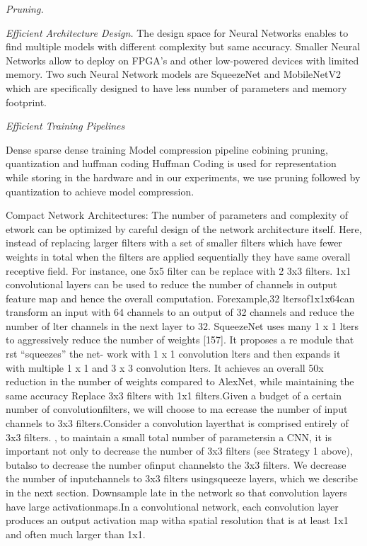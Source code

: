 \textit{Pruning.} \cite{Han:2015:LBW:2969239.2969366}


\textit{Efficient Architecture Design.} The design space for Neural Networks enables to find multiple models with different complexity but same accuracy.
Smaller Neural Networks allow to deploy on FPGA's and other low-powered devices with limited memory.
Two such Neural Network models are SqueezeNet \cite{DBLP:journals/corr/IandolaMAHDK16} and MobileNetV2 \cite{conf/cvpr/SandlerHZZC18} which are specifically designed to have less number of parameters and memory footprint.


\textit{Efficient Training Pipelines}

Dense sparse dense training \cite{DBLP:journals/corr/HanPNMTECTD16}
Model compression pipeline cobining pruning, quantization and huffman coding \cite{DBLP:journals/corr/HanMD15}
Huffman Coding is used for representation while storing in the hardware and in our experiments, we use pruning followed by quantization to achieve model compression.


Compact Network Architectures: The number of parameters and complexity of etwork can be optimized by careful design of the network architecture itself.
Here, instead of replacing larger filters with a set of smaller filters which have fewer weights in total when the filters are applied sequentially they have same overall receptive field.
For instance, one 5x5 filter can be replace with 2 3x3 filters. 1x1 convolutional layers can be used to reduce the number of channels in output feature map and hence the overall computation.
Forexample,32 ltersof1x1x64can transform an input with 64 channels to an output of 32 channels and reduce the number of  lter channels in the next layer to 32. SqueezeNet uses many 1 x 1  lters to aggressively reduce the number of weights [157]. It proposes a  re module that  rst “squeezes” the net- work with 1 x 1 convolution  lters and then expands it with multiple 1 x 1 and 3 x 3 convolution  lters.
It achieves an overall 50x reduction in the number of weights compared to AlexNet, while maintaining the same accuracy
Replace 3x3 filters with 1x1 filters.Given a budget of a certain number of convolutionfilters,  we will choose to ma
ecrease the number of input channels to 3x3 filters.Consider a convolution layerthat is comprised entirely of 3x3 filters. , to maintain a small total number of parametersin a CNN, it is important not only to decrease the number of 3x3 filters (see Strategy 1 above), butalso to decrease the number ofinput channelsto the 3x3 filters.  We decrease the number of inputchannels to 3x3 filters usingsqueeze layers, which we describe in the next section.
Downsample late in the network so that convolution layers have large activationmaps.In a convolutional network, each convolution layer produces an output activation map witha spatial resolution that is at least 1x1 and often much larger than 1x1.



